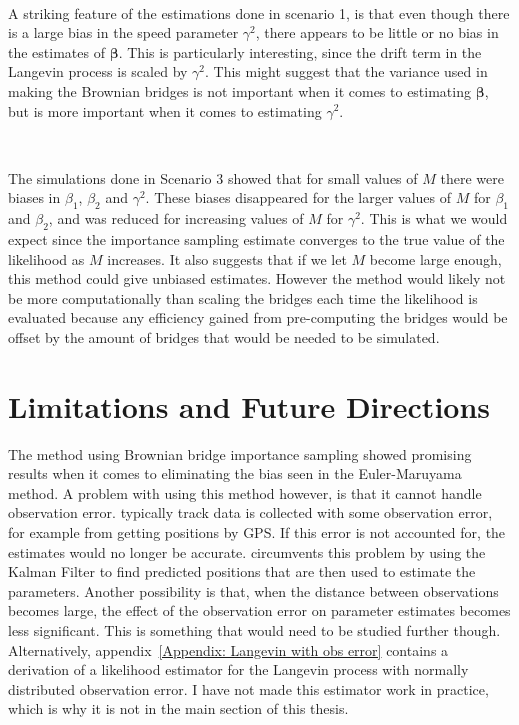 \

A striking feature of the estimations done in scenario 1, is that even though there is a large bias in the speed parameter $\gamma^2$, there appears to be little or no bias in the estimates of $\bm \beta$. This is particularly interesting, since the drift term in the Langevin process is scaled by $\gamma^2$. This might suggest that the variance used in making the Brownian bridges is not important when it comes to estimating $\bm \beta$, but is more important when it comes to estimating $\gamma^2$.

\


The simulations done in Scenario 3 showed that for small values of $M$ there were biases in $\beta_1$, $\beta_2$ and $\gamma^2$. These biases disappeared for the larger values of $M$ for $\beta_1$ and $\beta_2$, and was reduced for increasing values of $M$ for $\gamma^2$. This is what we would expect since the importance sampling estimate converges to the true value of the likelihood as $M$ increases. It also suggests that if we let $M$ become large enough, this method could give unbiased estimates. However the method would likely not be more computationally than scaling the bridges each time the likelihood is evaluated because any efficiency gained from pre-computing the bridges would be offset by the amount of bridges that would be needed to be simulated.



\section{Limitations and Future Directions}
The method using Brownian bridge importance sampling showed promising results when it comes to eliminating the bias seen in the Euler-Maruyama method. A problem with using this method however, is that it cannot handle observation error. typically track data is collected with some observation error, for example from getting positions by GPS. If this error is not accounted for, the estimates would no longer be accurate. \parencite{michelot_langevin_2019} circumvents this problem by using the Kalman Filter to find predicted positions that are then used to estimate the parameters. Another possibility is that, when the distance between observations becomes large, the effect of the observation error on parameter estimates becomes less significant. This is something that would need to be studied further though. Alternatively, appendix~\ref{Appendix: Langevin with obs error} contains a derivation of a likelihood estimator for the Langevin process with normally distributed observation error. I have not made this estimator work in practice, which is why it is not in the main section of this thesis.

